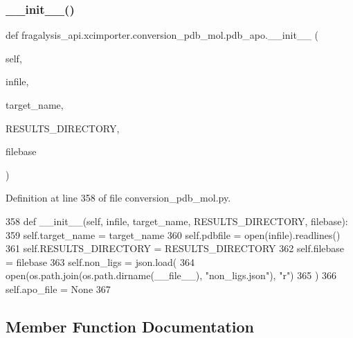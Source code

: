 \subsubsection{\texorpdfstring{\+\_\+\+\_\+init\+\_\+\+\_\+()}{\_\_init\_\_()}}
{\footnotesize\ttfamily def fragalysis\+\_\+api.\+xcimporter.\+conversion\+\_\+pdb\+\_\+mol.\+pdb\+\_\+apo.\+\_\+\+\_\+init\+\_\+\+\_\+ (\begin{DoxyParamCaption}\item[{}]{self,  }\item[{}]{infile,  }\item[{}]{target\+\_\+name,  }\item[{}]{R\+E\+S\+U\+L\+T\+S\+\_\+\+D\+I\+R\+E\+C\+T\+O\+RY,  }\item[{}]{filebase }\end{DoxyParamCaption})}



Definition at line 358 of file conversion\+\_\+pdb\+\_\+mol.\+py.


\begin{DoxyCode}
358     \textcolor{keyword}{def }\_\_init\_\_(self, infile, target\_name, RESULTS\_DIRECTORY, filebase):
359         self.target\_name = target\_name
360         self.pdbfile = open(infile).readlines()
361         self.RESULTS\_DIRECTORY = RESULTS\_DIRECTORY
362         self.filebase = filebase
363         self.non\_ligs = json.load(
364             open(os.path.join(os.path.dirname(\_\_file\_\_), \textcolor{stringliteral}{"non\_ligs.json"}), \textcolor{stringliteral}{"r")}
365 \textcolor{stringliteral}{        )}
366 \textcolor{stringliteral}{        self.apo\_file = }\textcolor{keywordtype}{None}
367 
\end{DoxyCode}


\subsection{Member Function Documentation}
\mbox{\label{classfragalysis__api_1_1xcimporter_1_1conversion__pdb__mol_1_1pdb__apo_ab88e88fe9d512e1635e5f1d61040f9f6}} 
